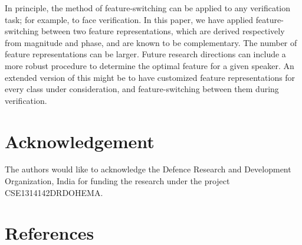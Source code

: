 \documentclass[preprint,12pt,5p]{elsarticle}
\begin{document}
In principle, the method of feature-switching can be applied to any verification
task; for example, to face verification. In this paper, we have applied
feature-switching between two feature representations, which are derived
respectively from magnitude and phase, and are known to be complementary. 
The number of feature representations can be larger. Future
research directions can include a more robust procedure to determine the optimal
feature for a given speaker. An extended version of this might be to have customized
feature representations for every class under consideration, and
feature-switching between them during verification.

\section{Acknowledgement}
\label{sec:ack}
The authors would like to acknowledge the Defence Research and Development 
Organization, India for funding the research under the project 
CSE1314142DRDOHEMA. 

\section*{References}

%

\end{document}
